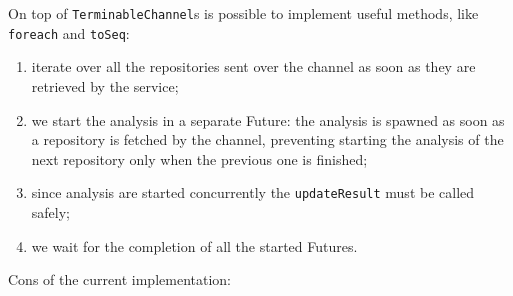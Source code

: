 \documentclass[aspectratio=169,xcolor=dvipsnames]{beamer}
\begin{document}
\begin{frame}
    
\end{frame}


\begin{frame}
    
\end{frame}


\begin{frame}
    \small
    On top of \texttt{TerminableChannel}s is possible to implement useful methods, like \texttt{foreach} and \texttt{toSeq}:
    
\end{frame}


\begin{frame}
    
    \footnotesize
    \begin{enumerate}
        \item iterate over all the repositories sent over the channel as soon as they are retrieved by the service;
        \item we start the analysis in a separate Future: the analysis is spawned as soon as a repository is fetched by the channel, preventing starting the analysis of the next repository only when the previous one is finished;
        \item since analysis are started concurrently the \texttt{updateResult} must be called safely;
        \item we wait for the completion of all the started Futures.
    \end{enumerate}
\end{frame}


\begin{frame}
    Cons of the current implementation:
\end{frame}

\end{document}
